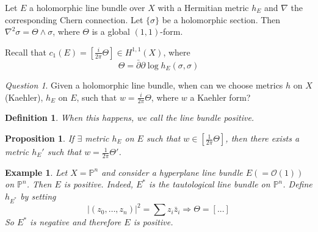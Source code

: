 \documentclass[12pt]{article}
\theoremstyle{darkgreentheorem}
\newtheorem{prop}[thm]{Proposition}
\theoremstyle{darkbluedefinition}
\newtheorem{defn}[thm]{Definition}
\theoremstyle{darkredexample}
\newtheorem{exa}[thm]{Example}
\theoremstyle{remark}
\newtheorem{q}[thm]{Question}
\newcommand{\1}{\mathbbm{1}}
\renewcommand{\P}{\mathbb{P}}
\renewcommand{\O}{\mathcal{O}}
\begin{document}
Let $E$ a holomorphic line bundle over $X$ with a Hermitian metric $h_{E}$ and $\nabla$ the corresponding Chern connection.
Let $\{\sigma \}$ be a holomorphic section.
Then $\nabla^{2}\sigma=\Theta \wedge \sigma $, where $\Theta $ is a global $(1,1)$-form.

Recall that $c_{1}(E)=[\frac{i}{2\pi}\Theta ]\in H^{1,1}(X)$, where
\[ \Theta=\bar{\partial}\partial \log h_{E}(\sigma, \sigma) \]

\begin{q}
    Given a holomorphic line bundle, when can we choose metrics $h$ on $X$ (Kaehler), $h_{E}$ on $E$, such that $w=\frac{i}{2\pi}\Theta $, where $w$ a Kaehler form?
\end{q}

\begin{defn}
    When this happens, we call the line bundle \textit{positive}.
\end{defn}

\begin{prop}
    If $\exists$ metric $h_{E}$ on $E$ such that $w\in [\frac{1}{2\pi}\Theta ]$, then there exists a metric $h_{E}'$ such that $w=\frac{1}{2\pi}\Theta'$.
\end{prop}

\begin{exa}
    Let $X=\P^{n}$ and consider a hyperplane line bundle $E(=\O(1))$ on $\P^{n}$.
    Then $E$ is positive.
    Indeed, $E^{*}$ is the tautological line bundle on $\P^{n}$.
    Define $h_{E^{*}}$ by setting
    \[ |(z_{0},\ldots,z_{n})|^{2}=\sum z_{i}\bar{z}_{i} \Rightarrow \Theta= [...]\]
    So $E^{*}$ is negative and therefore $E$ is positive.
\end{exa}
\end{document}
